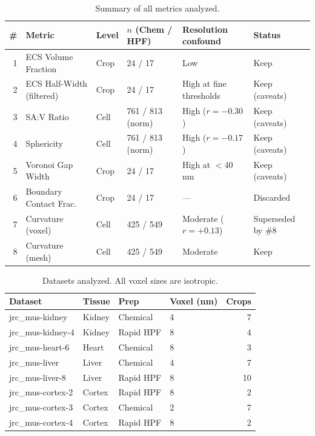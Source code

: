 \documentclass[times, twoside]{zHenriquesLab-StyleBioRxiv}
\begin{document}
\begin{table}[t]
\centering
\caption{Summary of all metrics analyzed.}
\label{tab:summary}
\begin{tabular}{rlllll}
\toprule
\# & Metric & Level & $n$ (Chem / HPF) & Resolution confound & Status \\
\midrule
1 & ECS Volume Fraction & Crop & 24 / 17 & Low & Keep \\
2 & ECS Half-Width (filtered) & Crop & 24 / 17 & High at fine thresholds & Keep (caveats) \\
3 & SA:V Ratio & Cell & 761 / 813 (norm) & High ($r{=}-0.30$) & Keep (caveats) \\
4 & Sphericity & Cell & 761 / 813 (norm) & High ($r{=}-0.17$) & Keep (caveats) \\
5 & Voronoi Gap Width & Crop & 24 / 17 & High at $<$40\,nm & Keep (caveats) \\
6 & Boundary Contact Frac. & Crop & 24 / 17 & --- & Discarded \\
7 & Curvature (voxel) & Cell & 425 / 549 & Moderate ($r{=}+0.13$) & Superseded by \#8 \\
8 & Curvature (mesh) & Cell & 425 / 549 & Moderate & Keep \\
\bottomrule
\end{tabular}
\end{table}


\begin{table}[t]
\centering
\caption{Datasets analyzed. All voxel sizes are isotropic.}
\label{tab:datasets}
\begin{tabular}{llllr}
\toprule
Dataset & Tissue & Prep & Voxel (nm) & Crops \\
\midrule
jrc\_mus-kidney     & Kidney & Chemical  & 4 & 7 \\
jrc\_mus-kidney-4   & Kidney & Rapid HPF & 8 & 4 \\
jrc\_mus-heart-6    & Heart  & Chemical  & 8 & 3 \\
jrc\_mus-liver      & Liver  & Chemical  & 4 & 7 \\
jrc\_mus-liver-8    & Liver  & Rapid HPF & 8 & 10 \\
jrc\_mus-cortex-2   & Cortex & Rapid HPF & 8 & 2 \\
jrc\_mus-cortex-3   & Cortex & Chemical  & 2 & 7 \\
jrc\_mus-cortex-4   & Cortex & Rapid HPF & 8 & 2 \\
\bottomrule
\end{tabular}
\end{table}
\end{document}
